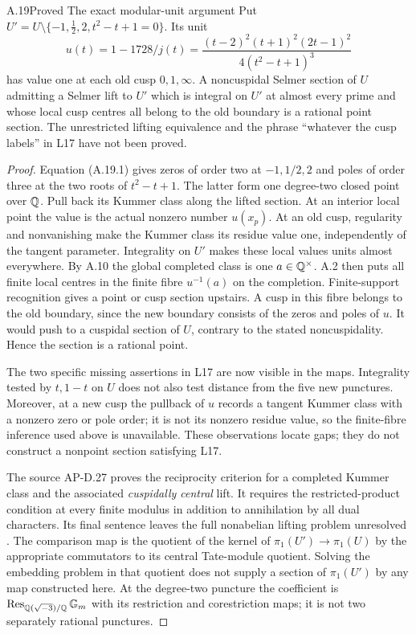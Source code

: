 \begin{statement}{A.19}{Proved}
{The exact modular-unit argument}
Put $U'=U\setminus\{-1,\tfrac12,2,t^2-t+1=0\}$.  Its unit
\[
 u(t)=1-1728/j(t)=
       \frac{(t-2)^2(t+1)^2(2t-1)^2}{4(t^2-t+1)^3}
\tag{A.19.1}
\]
has value one at each old cusp $0,1,\infty$.
A noncuspidal Selmer section of $U$ admitting a Selmer lift to $U'$
which is integral on $U'$ at almost every prime and whose local cusp
centres all belong to the old boundary is a rational point section.
The unrestricted lifting equivalence and the phrase ``whatever the
cusp labels'' in L17 have not been proved.
\end{statement}
\begin{proof}
Equation (A.19.1) gives zeros of order two at $-1,1/2,2$ and poles of
order three at the two roots of $t^2-t+1$.  The latter form one
degree-two closed point over $\mathbb Q$.  Pull back its Kummer class along
the lifted section.  At an interior local point the value is the
actual nonzero number $u(x_p)$.  At an old cusp, regularity and
nonvanishing make the Kummer class its residue value one, independently
of the tangent parameter.  Integrality on $U'$ makes these local values
units almost everywhere.  By A.10 the global completed class is one
$a\in\mathbb Q^\times$.  A.2 then puts all finite local centres in the
finite fibre $u^{-1}(a)$ on the completion.  Finite-support recognition
gives a point or cusp section upstairs.  A cusp in this fibre belongs
to the old boundary, since the new boundary consists of the zeros and
poles of $u$.  It would push to a cuspidal section of $U$, contrary to
the stated noncuspidality.  Hence the section is a rational point.

The two specific missing assertions in L17 are now visible in the
maps.  Integrality tested by $t,1-t$ on $U$ does not also test distance
from the five new punctures.  Moreover, at a new cusp the pullback of
$u$ records a tangent Kummer class with a nonzero zero or pole order;
it is not its nonzero residue value, so the finite-fibre inference used
above is unavailable.  These observations locate gaps; they do not
construct a nonpoint section satisfying L17.

The source AP-D.27 proves the reciprocity criterion for a completed
Kummer class and the associated \emph{cuspidally central} lift.  It
requires the restricted-product condition at every finite modulus in
addition to annihilation by all dual characters.  Its final sentence
leaves the full nonabelian lifting problem unresolved
\cite{LegAP2026}.  The comparison map is the quotient of the kernel
of $\pi_1(U')\to\pi_1(U)$ by the appropriate commutators to its
central Tate-module quotient.  Solving the embedding problem in that
quotient does not supply a section of $\pi_1(U')$ by any map constructed
here.  At the degree-two puncture the coefficient is
$\operatorname{Res}_{\mathbb Q(\sqrt{-3})/\mathbb Q}\mathbb G_m$ with its
restriction and corestriction maps; it is not two separately rational
punctures.
\end{proof}

